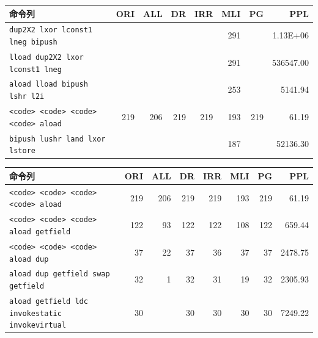 \documentclass[12pt,twoside]{jbook}
\begin{document}
\begin{table}[t]
{  \begin{tabular}{lrrrrrrr}
   命令列 &
    \multicolumn{1}{p{1cm}}{ORI} & 
    \multicolumn{1}{p{1cm}}{ALL} & 
    \multicolumn{1}{p{1cm}}{DR} & 
    \multicolumn{1}{p{1cm}}{IRR} & 
    \multicolumn{1}{p{1cm}}{MLI} & 
    \multicolumn{1}{p{1cm}}{PG} & 
    \multicolumn{1}{p{1cm}}{PPL} \\ \hline
    \texttt{dup2X2 lxor lconst1 lneg bipush}   &     &     &     &     & 291 &     & 1.13E+06 \\
    \texttt{lload dup2X2 lxor lconst1 lneg}    &     &     &     &     & 291 &     & 536547.00 \\
    \texttt{aload lload bipush lshr l2i}       &     &     &     &     & 253 &     & 5141.94 \\
    \texttt{<code> <code> <code> <code> aload} & 219 & 206 & 219 & 219 & 193 & 219 & 61.19 \\
    \texttt{bipush lushr land lxor lstore}     &     &     &     &     & 187 &     & 52136.30 \\
  \end{tabular}
  
  \begin{tabular}{lrrrrrrr}
   命令列 &
    \multicolumn{1}{p{1cm}}{ORI} & 
    \multicolumn{1}{p{1cm}}{ALL} & 
    \multicolumn{1}{p{1cm}}{DR} & 
    \multicolumn{1}{p{1cm}}{IRR} & 
    \multicolumn{1}{p{1cm}}{MLI} & 
    \multicolumn{1}{p{1cm}}{PG} & 
    \multicolumn{1}{p{1cm}}{PPL} \\ \hline
   \texttt{<code> <code> <code> <code> aload}              & 219 & 206 & 219 & 219 & 193 & 219 & 61.19 \\
    \texttt{<code> <code> <code> aload getfield}           & 122 &  93 & 122 & 122 & 108 & 122 & 659.44 \\
    \texttt{<code> <code> <code> aload dup}                & 37  &  22 &  37 &  36 &  37 &  37 & 2478.75 \\
    \texttt{aload dup getfield swap getfield}              & 32  &   1 &  32 &  31 &  19 &  32 & 2305.93 \\
    \texttt{aload getfield ldc invokestatic invokevirtual} & 30  &     &  30 &  30 &  30 &  30 & 7249.22 \\  \end{tabular}}
\end{table}
\end{document}
